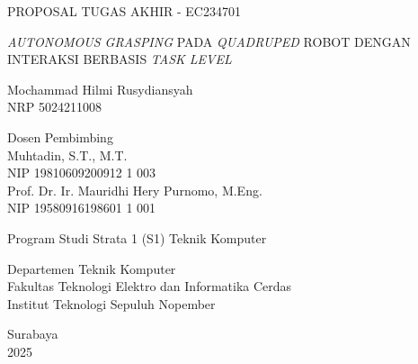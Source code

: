 \begin{large}
  PROPOSAL TUGAS AKHIR - EC234701
\end{large}

\vspace{\fill}

\begin{spacing}{1.5}
  \begin{Large}
    \emph{AUTONOMOUS GRASPING} PADA \emph{QUADRUPED} ROBOT
    DENGAN INTERAKSI BERBASIS \emph{TASK LEVEL}
  \end{Large}
\end{spacing}

\vspace{\fill}

\begin{large}
  Mochammad Hilmi Rusydiansyah \\
  \textmd{NRP 5024211008}
\end{large}

\vspace{\fill}

\begin{large}
  \textmd{Dosen Pembimbing} \\
  Muhtadin, S.T., M.T. \\
  \textmd{NIP 19810609200912 1 003} \\
  Prof. Dr. Ir. Mauridhi Hery Purnomo, M.Eng. \\
  \textmd{NIP 19580916198601 1 001}
\end{large}

\vspace{\fill}

Program Studi Strata 1 (S1) Teknik Komputer \\

\mdseries

Departemen Teknik Komputer \\
Fakultas Teknologi Elektro dan Informatika Cerdas \\
Institut Teknologi Sepuluh Nopember

Surabaya \\
2025
